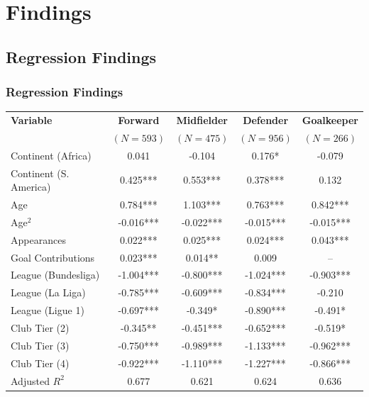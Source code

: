 \documentclass[t,aspectratio=169,xcolor=dvipsnames]{beamer}
\begin{document}
\section{Findings}
\subsection{Regression Findings}
\begin{frame}[shrink=10]
    \frametitle{Regression Findings} 
    
    \begin{table}[ht]
        \scriptsize
        \centering
        \setlength{\tabcolsep}{3pt}
        \begin{tabular}{l|cccc}
            \hline
            \textbf{Variable} & \textbf{Forward} & \textbf{Midfielder} & \textbf{Defender} & \textbf{Goalkeeper} \\
            & $(N=593)$ & $(N=475)$ & $(N=956)$ & $(N=266)$ \\
            \hline
            Continent (Africa) & 0.041 & -0.104 & 0.176* & -0.079 \\
            Continent (S. America) & \cellcolor{yellow!30}0.425*** & \cellcolor{yellow!30}0.553*** & \cellcolor{yellow!30}0.378*** & \cellcolor{yellow!30}0.132 \\
            Age & 0.784*** & 1.103*** & 0.763*** & 0.842*** \\
            Age$^2$ & \cellcolor{red!20}-0.016*** & \cellcolor{red!20}-0.022*** & \cellcolor{red!20}-0.015*** & \cellcolor{red!20}-0.015*** \\
            Appearances & 0.022*** & 0.025*** & 0.024*** & 0.043*** \\
            Goal Contributions & 0.023*** & 0.014** & 0.009 & -- \\
            League (Bundesliga) & \cellcolor{blue!20}-1.004*** & \cellcolor{blue!20}-0.800*** & \cellcolor{blue!20}-1.024*** & \cellcolor{blue!20}-0.903*** \\
            League (La Liga) & -0.785*** & -0.609*** & -0.834*** & -0.210 \\
            League (Ligue 1) & -0.697*** & -0.349* & -0.890*** & -0.491* \\
            Club Tier (2) & -0.345** & -0.451*** & -0.652*** & -0.519* \\
            Club Tier (3) & -0.750*** & -0.989*** & -1.133*** & -0.962*** \\
            Club Tier (4) & -0.922*** & -1.110*** & -1.227*** & -0.866*** \\
            \hline
            Adjusted $R^2$ & \cellcolor{green!20}0.677 & \cellcolor{green!20}0.621 & \cellcolor{green!20}0.624 & \cellcolor{green!20}0.636 \\
            \hline
        \end{tabular}
        

\end{table}
\end{frame}
\end{document}
